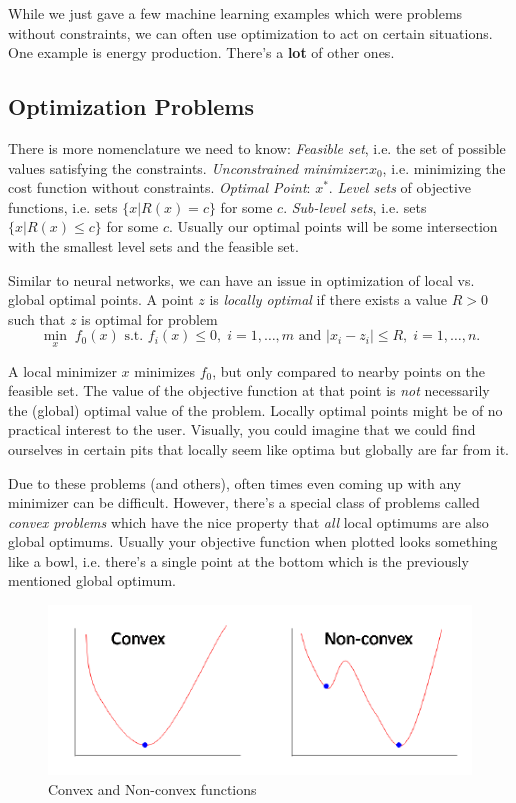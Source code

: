 \documentclass[11 pt]{scrartcl}
\begin{document}
While we just gave a few machine learning examples which were problems without constraints, we can often use optimization to act on certain situations. 
One example is energy production. 
There's a \textbf{lot} of other ones. 


\subsection{Optimization Problems}
There is more nomenclature we need to know: 
\itemnum
    \ii \emph{Feasible set}, i.e. the set of possible values satisfying the constraints. 
    \ii \emph{Unconstrained minimizer}:$x_0$, i.e. minimizing the cost function without constraints. 
    \ii \emph{Optimal Point}: $x^*$. 
    \ii \emph{Level sets} of objective functions, i.e. sets $\{x | R(x) = c\}$ for some $c$. 
    \ii \emph{Sub-level sets}, i.e. sets $\{ x | R(x) \leq c\}$ for some $c$. 
\itemend
Usually our optimal points will be some intersection with the smallest level sets and the feasible set. 

Similar to neural networks, we can have an issue in optimization of local vs. global optimal points. 
A point $z$ is \emph{locally optimal} if there exists a value $R>0$ such that $z$ is optimal for problem 
\[ \min_x\; f_0(x) \text{ s.t. } f_i(x) \leq 0,\;  i=1, \dots, m \text{ and } |x_i - z_i| \leq R,\; i=1, \dots, n.\] 

A local minimizer $x$ minimizes $f_0$, but only compared to nearby points on the feasible set. 
The value of the objective function at that point is \emph{not} necessarily the (global) optimal value of the problem. 
Locally optimal points might be of no practical interest to the user. 
Visually, you could imagine that we could find ourselves in certain pits that locally seem like optima but globally are far from it. 

Due to these problems (and others), often times even coming up with any minimizer can be difficult. 
However, there's a special class of problems called \emph{convex problems} which have the nice property that \emph{all} local optimums are also global optimums.
Usually your objective function when plotted looks something like a bowl, i.e. there's a single point at the bottom which is the previously mentioned global optimum.

\begin{figure}[!htb]
    \centering
    \includegraphics[scale=0.6]{convexnonconvex.png}
    \caption{Convex and Non-convex functions}
\end{figure}
\end{document}
